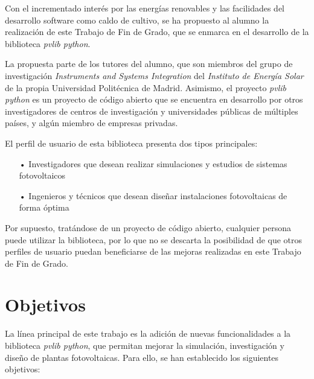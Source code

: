 Con el incrementado interés por las energías renovables y las facilidades del desarrollo software como caldo de cultivo, se ha propuesto al alumno la realización de este Trabajo de Fin de Grado, que se enmarca en el desarrollo de la biblioteca \textit{pvlib python}.

La propuesta parte de los tutores del alumno, que son miembros del grupo de investigación \textit{Instruments and Systems Integration} del \textit{Instituto de Energía Solar} de la propia Universidad Politécnica de Madrid. Asimismo, el proyecto \textit{pvlib python} es un proyecto de código abierto que se encuentra en desarrollo por otros investigadores de centros de investigación y universidades públicas de múltiples países, y algún miembro de empresas privadas.

El perfil de usuario de esta biblioteca presenta dos tipos principales:

\begin{itemize}

    \item[•] Investigadores que desean realizar simulaciones y estudios de sistemas fotovoltaicos

    \item[•] Ingenieros y técnicos que desean diseñar instalaciones fotovoltaicas de forma óptima
    
\end{itemize}

Por supuesto, tratándose de un proyecto de código abierto, cualquier persona puede utilizar la biblioteca, por lo que no se descarta la posibilidad de que otros perfiles de usuario puedan beneficiarse de las mejoras realizadas en este Trabajo de Fin de Grado.


\section{Objetivos} \label{sct:intro:objetivos}

La línea principal de este trabajo es la adición de nuevas funcionalidades a la biblioteca \textit{pvlib python}, que permitan mejorar la simulación, investigación y diseño de plantas fotovoltaicas. Para ello, se han establecido los siguientes objetivos:

